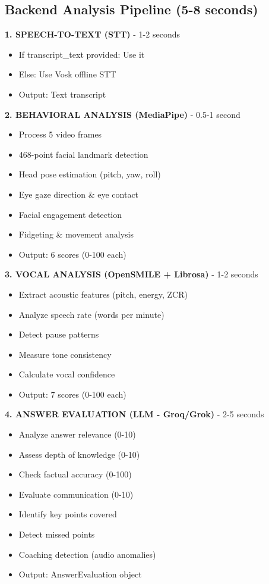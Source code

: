 \documentclass[12pt,a4paper]{article}
\begin{document}
\subsection{Backend Analysis Pipeline (5-8 seconds)}

\begin{tcolorbox}[colback=lightgray,colframe=black,title=\textbf{Multi-Modal Analysis Pipeline}]

\textbf{1. SPEECH-TO-TEXT (STT)} - 1-2 seconds
\begin{itemize}
    \item If transcript\_text provided: Use it
    \item Else: Use Vosk offline STT
    \item Output: Text transcript
\end{itemize}

\textbf{2. BEHAVIORAL ANALYSIS (MediaPipe)} - 0.5-1 second
\begin{itemize}
    \item Process 5 video frames
    \item 468-point facial landmark detection
    \item Head pose estimation (pitch, yaw, roll)
    \item Eye gaze direction \& eye contact
    \item Facial engagement detection
    \item Fidgeting \& movement analysis
    \item Output: 6 scores (0-100 each)
\end{itemize}

\textbf{3. VOCAL ANALYSIS (OpenSMILE + Librosa)} - 1-2 seconds
\begin{itemize}
    \item Extract acoustic features (pitch, energy, ZCR)
    \item Analyze speech rate (words per minute)
    \item Detect pause patterns
    \item Measure tone consistency
    \item Calculate vocal confidence
    \item Output: 7 scores (0-100 each)
\end{itemize}

\textbf{4. ANSWER EVALUATION (LLM - Groq/Grok)} - 2-5 seconds
\begin{itemize}
    \item Analyze answer relevance (0-10)
    \item Assess depth of knowledge (0-10)
    \item Check factual accuracy (0-100)
    \item Evaluate communication (0-10)
    \item Identify key points covered
    \item Detect missed points
    \item Coaching detection (audio anomalies)
    \item Output: AnswerEvaluation object
\end{itemize}


\end{tcolorbox}
\end{document}
